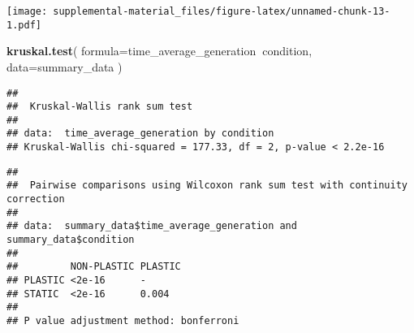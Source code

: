 \documentclass[]{book}
\newenvironment{Shaded}{\begin{snugshade}}{\end{snugshade}}
\newcommand{\DataTypeTok}[1]{\textcolor[rgb]{0.13,0.29,0.53}{#1}}
\newcommand{\KeywordTok}[1]{\textcolor[rgb]{0.13,0.29,0.53}{\textbf{#1}}}
\newcommand{\NormalTok}[1]{#1}
\newcommand{\OperatorTok}[1]{\textcolor[rgb]{0.81,0.36,0.00}{\textbf{#1}}}
\newcommand{\StringTok}[1]{\textcolor[rgb]{0.31,0.60,0.02}{#1}}
\begin{document}
\texttt{[image: supplemental-material\_files/figure-latex/unnamed-chunk-13-1.pdf]}

\begin{Shaded}
\begin{Highlighting}[]
\KeywordTok{kruskal.test}\NormalTok{(}
  \DataTypeTok{formula=}\NormalTok{time_average_generation}\OperatorTok{~}\NormalTok{condition,}
  \DataTypeTok{data=}\NormalTok{summary_data}
\NormalTok{)}
\end{Highlighting}
\end{Shaded}

\begin{verbatim}
## 
##  Kruskal-Wallis rank sum test
## 
## data:  time_average_generation by condition
## Kruskal-Wallis chi-squared = 177.33, df = 2, p-value < 2.2e-16
\end{verbatim}

\begin{Shaded}
\end{Shaded}

\begin{verbatim}
## 
##  Pairwise comparisons using Wilcoxon rank sum test with continuity correction 
## 
## data:  summary_data$time_average_generation and summary_data$condition 
## 
##         NON-PLASTIC PLASTIC
## PLASTIC <2e-16      -      
## STATIC  <2e-16      0.004  
## 
## P value adjustment method: bonferroni
\end{verbatim}

\begin{Shaded}
\end{Shaded}
\end{document}

